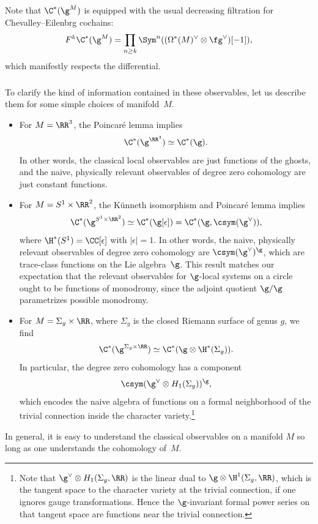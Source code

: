 \documentclass[10pt]{amsart}
\begin{document}
Note that $\C^*(\g^M)$ is equipped with the usual decreasing filtration for Chevalley--Eilenbrg cochains:
\[
F^k \C^*(\g^M) = \prod_{n \geq k} \Sym^n((\Omega^*(M)^\vee \otimes \fg^\vee)[-1]),
\]
which manifestly respects the differential.

\subsubsection{}
\label{subsec:obscl special values}

To clarify the kind of information contained in these observables,
let us describe them for some simple choices of manifold~$M$.
\begin{itemize}
\item For $M = \RR^3$, the Poincar\'e lemma implies
\[
\C^*(\g^{\RR^3}) \simeq \C^*(\g).
\]
In other words, the classical local observables are just functions of the ghosts, 
and the naive, physically relevant observables of degree zero cohomology are just constant functions.
\item For $M = S^1 \times \RR^2$, the K\"unneth isomorphism and Poincar\'e lemma implies
\[
\C^*(\g^{S^1 \times \RR^2}) \simeq \C^*(\g[\epsilon]) = \C^*(\g, \csym(\g^\vee)),
\]
where $\H^*(S^1) = \CC[\epsilon]$ with $|\epsilon| = 1$. 
In other words, the naive, physically relevant observables of degree zero cohomology are $\csym(\g^\vee)^\g$, which are trace-class functions on the Lie algebra~$\g$.
This result matches our expectation that the relevant observables for $\g$-local systems on a circle ought to be functions of monodromy, 
since the adjoint quotient $\g/\g$ parametrizes possible monodromy.
\item For $M = \Sigma_g \times \RR$, where $\Sigma_g$ is the closed Riemann surface of genus $g$, we find
\[
\C^*(\g^{\Sigma_g \times \RR}) \simeq \C^*(\g\otimes \H^*(\Sigma_g)).
\]
In particular, the degree zero cohomology has a component 
\[
\csym(\g^\vee \otimes H_1(\Sigma_g))^\g,
\]
which encodes the naive algebra of functions on a formal neighborhood of the trivial connection inside the character variety.\footnote{Note that $\g^\vee \otimes H_1(\Sigma_g,\RR)$ is the linear dual to $\g \otimes \H^1(\Sigma_g,\RR)$, which is the tangent space to the character variety at the trivial connection, if one ignores gauge transformations. Hence the $\g$-invariant formal power series on that tangent space are functions near the trivial connection.}
\end{itemize}
In general, it is easy to understand the classical observables on a manifold $M$ 
so long as one understands the cohomology of~$M$.
\end{document}
